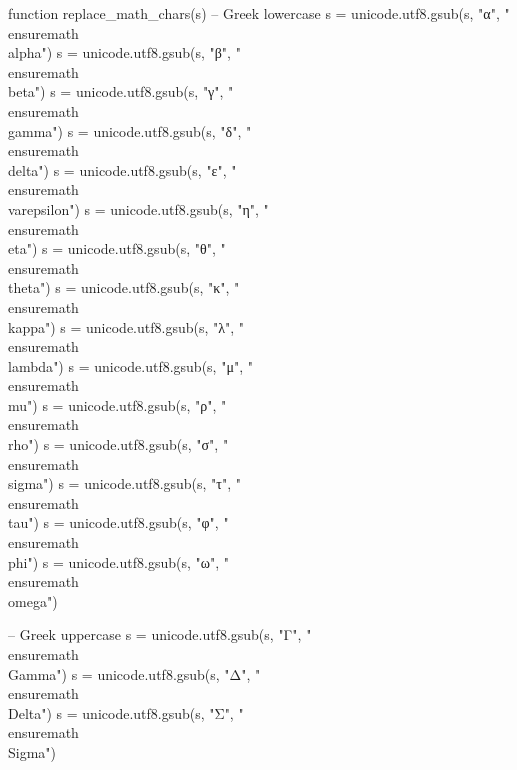   \begin{luacode*}
  function replace_math_chars(s)
    -- Greek lowercase
    s = unicode.utf8.gsub(s, "α", "\\ensuremath{\\alpha}")
    s = unicode.utf8.gsub(s, "β", "\\ensuremath{\\beta}")
    s = unicode.utf8.gsub(s, "γ", "\\ensuremath{\\gamma}")
    s = unicode.utf8.gsub(s, "δ", "\\ensuremath{\\delta}")
    s = unicode.utf8.gsub(s, "ε", "\\ensuremath{\\varepsilon}")
    s = unicode.utf8.gsub(s, "η", "\\ensuremath{\\eta}")
    s = unicode.utf8.gsub(s, "θ", "\\ensuremath{\\theta}")
    s = unicode.utf8.gsub(s, "κ", "\\ensuremath{\\kappa}")
    s = unicode.utf8.gsub(s, "λ", "\\ensuremath{\\lambda}")
    s = unicode.utf8.gsub(s, "μ", "\\ensuremath{\\mu}")
    s = unicode.utf8.gsub(s, "ρ", "\\ensuremath{\\rho}")
    s = unicode.utf8.gsub(s, "σ", "\\ensuremath{\\sigma}")
    s = unicode.utf8.gsub(s, "τ", "\\ensuremath{\\tau}")
    s = unicode.utf8.gsub(s, "φ", "\\ensuremath{\\phi}")
    s = unicode.utf8.gsub(s, "ω", "\\ensuremath{\\omega}")
    
    -- Greek uppercase
    s = unicode.utf8.gsub(s, "Γ", "\\ensuremath{\\Gamma}")
    s = unicode.utf8.gsub(s, "Δ", "\\ensuremath{\\Delta}")
    s = unicode.utf8.gsub(s, "Σ", "\\ensuremath{\\Sigma}")
    

\end{luacode*}
